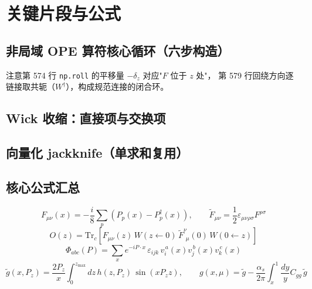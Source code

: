 \documentclass[UTF8]{ctexart}
\begin{document}
\section{关键片段与公式}

\subsection{非局域 OPE 算符核心循环（六步构造）}



注意第 574 行 \texttt{np.roll} 的平移量 $-\delta_z$ 对应"$F$ 位于 $z$ 处"，
第 579 行回绕方向逐链接取共轭（$W^\dagger$），构成规范连接的闭合环。

\subsection{Wick 收缩：直接项与交换项}



\subsection{向量化 jackknife（单求和复用）}



\subsection{核心公式汇总}

\begin{equation}
F_{\mu\nu}(x) = -\frac{i}{8}\sum_{p}\left(P_p(x)-P_p^\dagger(x)\right),\qquad
\tilde{F}_{\mu\nu} = \frac{1}{2}\varepsilon_{\mu\nu\rho\sigma}F^{\rho\sigma}
\end{equation}
\begin{equation}
O(z) = \mathrm{Tr}_c\!\left[F_{\mu\nu}(z)\,W(z{\leftarrow}0)\,
\tilde{F}^{\nu}_{\ \,\mu}(0)\,W(0{\leftarrow}z)\right]
\end{equation}
\begin{equation}
\Phi_{abc}(P) = \sum_x e^{-iP\cdot x}\,\varepsilon_{ijk}\,
v_i^{\,a}(x)v_j^{\,b}(x)v_k^{\,c}(x)
\end{equation}
\begin{equation}
\tilde g(x,P_z) = \frac{2P_z}{x}\int_0^{z_{\max}}\!dz\,
h(z,P_z)\,\sin(xP_z z),\qquad
g(x,\mu) = \tilde g - \frac{\alpha_s}{2\pi}\int_x^1\frac{dy}{y}C_{gg}\,\tilde g
\end{equation}
\end{document}
